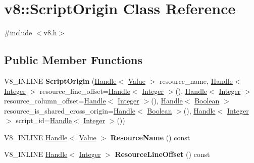 \hypertarget{classv8_1_1_script_origin}{}\section{v8\+:\+:Script\+Origin Class Reference}
\label{classv8_1_1_script_origin}


{\ttfamily \#include $<$v8.\+h$>$}

\subsection*{Public Member Functions}
\begin{DoxyCompactItemize}
\item 
\hypertarget{classv8_1_1_script_origin_add31e4754a4b7173c2f7e6c3af306721}{}V8\+\_\+\+I\+N\+L\+I\+N\+E {\bfseries Script\+Origin} (\hyperlink{classv8_1_1_handle}{Handle}$<$ \hyperlink{classv8_1_1_value}{Value} $>$ resource\+\_\+name, \hyperlink{classv8_1_1_handle}{Handle}$<$ \hyperlink{classv8_1_1_integer}{Integer} $>$ resource\+\_\+line\+\_\+offset=\hyperlink{classv8_1_1_handle}{Handle}$<$ \hyperlink{classv8_1_1_integer}{Integer} $>$(), \hyperlink{classv8_1_1_handle}{Handle}$<$ \hyperlink{classv8_1_1_integer}{Integer} $>$ resource\+\_\+column\+\_\+offset=\hyperlink{classv8_1_1_handle}{Handle}$<$ \hyperlink{classv8_1_1_integer}{Integer} $>$(), \hyperlink{classv8_1_1_handle}{Handle}$<$ \hyperlink{classv8_1_1_boolean}{Boolean} $>$ resource\+\_\+is\+\_\+shared\+\_\+cross\+\_\+origin=\hyperlink{classv8_1_1_handle}{Handle}$<$ \hyperlink{classv8_1_1_boolean}{Boolean} $>$(), \hyperlink{classv8_1_1_handle}{Handle}$<$ \hyperlink{classv8_1_1_integer}{Integer} $>$ script\+\_\+id=\hyperlink{classv8_1_1_handle}{Handle}$<$ \hyperlink{classv8_1_1_integer}{Integer} $>$())\label{classv8_1_1_script_origin_add31e4754a4b7173c2f7e6c3af306721}

\item 
\hypertarget{classv8_1_1_script_origin_a289502d71720ca10e53b4a32d9226f58}{}V8\+\_\+\+I\+N\+L\+I\+N\+E \hyperlink{classv8_1_1_handle}{Handle}$<$ \hyperlink{classv8_1_1_value}{Value} $>$ {\bfseries Resource\+Name} () const \label{classv8_1_1_script_origin_a289502d71720ca10e53b4a32d9226f58}

\item 
\hypertarget{classv8_1_1_script_origin_a0735178b8afef9169a3481cf6cd7c557}{}V8\+\_\+\+I\+N\+L\+I\+N\+E \hyperlink{classv8_1_1_handle}{Handle}$<$ \hyperlink{classv8_1_1_integer}{Integer} $>$ {\bfseries Resource\+Line\+Offset} () const \label{classv8_1_1_script_origin_a0735178b8afef9169a3481cf6cd7c557}


\end{DoxyCompactItemize}
